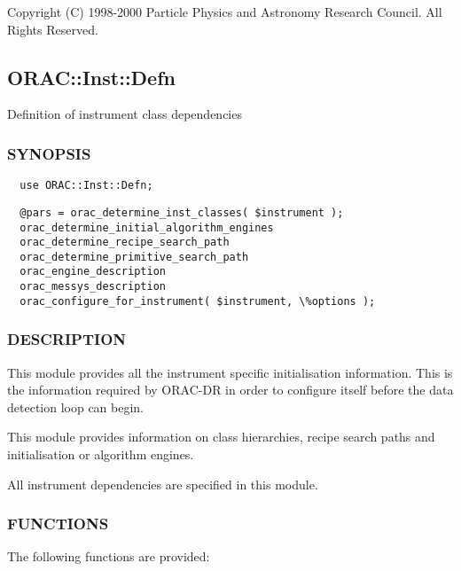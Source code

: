 Copyright (C) 1998-2000 Particle Physics and Astronomy Research
Council. All Rights Reserved.

\subsection{ORAC::Inst::Defn\label{ORAC::Inst::Defn}}


Definition of instrument class dependencies

\subsubsection*{SYNOPSIS\label{ORAC::Inst::Defn_SYNOPSIS}}
\begin{verbatim}
  use ORAC::Inst::Defn;
\end{verbatim}
\begin{verbatim}
  @pars = orac_determine_inst_classes( $instrument );
  orac_determine_initial_algorithm_engines
  orac_determine_recipe_search_path
  orac_determine_primitive_search_path
  orac_engine_description
  orac_messys_description
  orac_configure_for_instrument( $instrument, \%options );
\end{verbatim}
\subsubsection*{DESCRIPTION\label{ORAC::Inst::Defn_DESCRIPTION}}


This module provides all the instrument specific initialisation
information. This is the information required by ORAC-DR in order
to configure itself before the data detection loop can begin.



This module provides information on class hierarchies, recipe
search paths and initialisation or algorithm engines.



All instrument dependencies are specified in this module.

\subsubsection*{FUNCTIONS\label{ORAC::Inst::Defn_FUNCTIONS}}


The following functions are provided:

